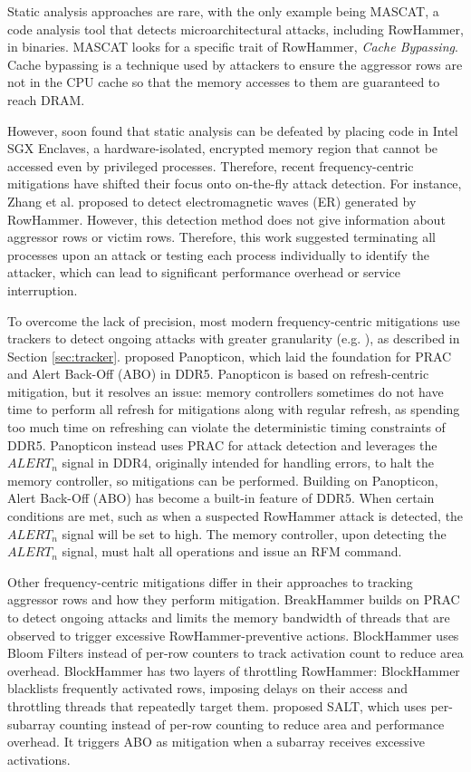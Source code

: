 \documentclass[journal,twocolumn]{IEEEtran}
\begin{document}
Static analysis approaches are rare, with the only example being MASCAT\cite{Irazoqui18}, a code analysis tool that detects microarchitectural attacks, including RowHammer, in binaries. MASCAT looks for a specific trait of RowHammer, \textit{Cache Bypassing}. Cache bypassing is a technique used by attackers to ensure the aggressor rows are not in the CPU cache so that the memory accesses to them are guaranteed to reach DRAM.

However, \cite{Gruss18} soon found that static analysis can be defeated by placing code in Intel SGX Enclaves, a hardware-isolated, encrypted memory region that cannot be accessed even by privileged processes. Therefore, recent frequency-centric mitigations have shifted their focus onto on-the-fly attack detection. For instance, Zhang et al.\cite{Zhang20} proposed to detect electromagnetic waves (ER) generated by RowHammer. However, this detection method does not give information about aggressor rows or victim rows. Therefore, this work suggested terminating all processes upon an attack or testing each process individually to identify the attacker, which can lead to significant performance overhead or service interruption.

To overcome the lack of precision, most modern frequency-centric mitigations use trackers to detect ongoing attacks with greater granularity (e.g. \cite{Bennett2021,DDR5,Yaglikci21,Qureshi26}), as described in Section \ref{sec:tracker}. \cite{Bennett2021} proposed Panopticon, which laid the foundation for PRAC and Alert Back-Off (ABO) in DDR5. Panopticon is based on refresh-centric mitigation, but it resolves an issue: memory controllers sometimes do not have time to perform all refresh for mitigations along with regular refresh, as spending too much time on refreshing can violate the deterministic timing constraints of DDR5\cite{Qureshi25}. Panopticon instead uses PRAC for attack detection and leverages the $ALERT_{n}$ signal in DDR4, originally intended for handling errors, to halt the memory controller, so mitigations can be performed. Building on Panopticon, Alert Back-Off (ABO)\cite{DDR5} has become a built-in feature of DDR5. When certain conditions are met, such as when a suspected RowHammer attack is detected, the $ALERT_{n}$ signal will be set to high. The memory controller, upon detecting the $ALERT_{n}$ signal, must halt all operations and issue an RFM command.

Other frequency-centric mitigations differ in their approaches to tracking aggressor rows and how they perform mitigation. BreakHammer\cite{Canpolat24} builds on PRAC to detect ongoing attacks and limits the memory bandwidth of threads that are observed to trigger excessive RowHammer-preventive actions. BlockHammer\cite{Yaglikci21} uses Bloom Filters instead of per-row counters to track activation count to reduce area overhead. BlockHammer has two layers of throttling RowHammer: BlockHammer blacklists frequently activated rows, imposing delays on their access and throttling threads that repeatedly target them. \cite{Qureshi26} proposed SALT, which uses per-subarray counting instead of per-row counting to reduce area and performance overhead. It triggers ABO as mitigation when a subarray receives excessive activations.
\end{document}
